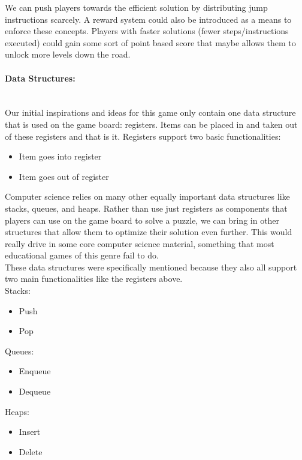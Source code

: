 We can push players towards the efficient solution by distributing jump instructions scarcely. A reward system could also be introduced as a means to enforce these concepts. Players with faster solutions (fewer steps/instructions executed) could gain some sort of point based score that maybe allows them to unlock more levels down the road.\\

\paragraph{Data Structures:} ~\\
Our initial inspirations and ideas for this game only contain one data structure that is used on the game board: registers. Items can be placed in and taken out of these registers and that is it. Registers support two basic functionalities:
\begin{itemize}
	\item Item goes into register
	\item Item goes out of register
\end{itemize}

Computer science relies on many other equally important data structures like stacks, queues, and heaps. Rather than use just registers as components that players can use on the game board to solve a puzzle, we can bring in other structures that allow them to optimize their solution even further. This would really drive in some core computer science material, something that most educational games of this genre fail to do.\\

These data structures were specifically mentioned because they also all support two main functionalities like the registers above.\\

Stacks:
\begin{itemize}
  \item Push
  \item Pop
\end{itemize}

Queues:
\begin{itemize}
  \item Enqueue
  \item Dequeue
\end{itemize}

Heaps:
\begin{itemize}
  \item Insert
  \item Delete
\end{itemize}

